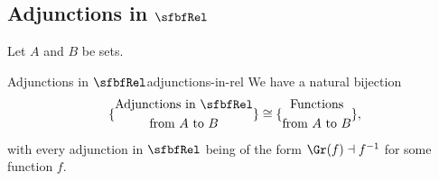 \subsection{Adjunctions in $\sfbfRel$}\label{subsection-adjunctions-in-rel}
Let $A$ and $B$ be sets.
\begin{proposition}{Adjunctions in $\sfbfRel$}{adjunctions-in-rel}%
    We have a natural bijection
    \[
        \{
            \begin{gathered}
                \text{Adjunctions in $\sfbfRel$}\\
                \text{from $A$ to $B$}
            \end{gathered}
        \}%
        \cong
        \{
            \begin{gathered}
                \text{Functions}\\
                \text{from $A$ to $B$}
            \end{gathered}
        \},
    \]%
    with every adjunction in $\sfbfRel$ being of the form $\Gr(f)\dashv f^{-1}$ for some function $f$.
\end{proposition}
